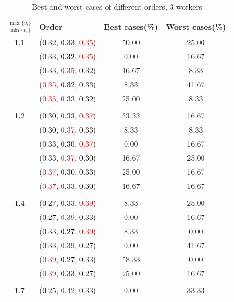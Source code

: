 \documentclass[10pt,a4paper]{report}
\begin{document}
\newpage\begin{center}
	\small
	\begin{longtable}{clcc}
		\caption{Best and worst cases of different orders, 3 workers}\\
		\toprule
		\setlength{\tabcolsep}{1mm}
		\renewcommand\baselinestretch{0.5}\selectfont
		$\frac{\max\{v_i\}}{\min\{v_i\}}$ & Order & Best cases(\%) & Worst cases(\%) \\
			\midrule		1.1			&(\textcolor{black}{0.32}, 0.33, \textcolor{red}{0.35})&50.00&25.00\\
			&(0.33, \textcolor{black}{0.32}, \textcolor{red}{0.35})&0.00&16.67\\
			&(0.33, \textcolor{red}{0.35}, \textcolor{black}{0.32})&16.67&8.33\\
			&(\textcolor{red}{0.35}, \textcolor{black}{0.32}, 0.33)&8.33&41.67\\
			&(\textcolor{red}{0.35}, 0.33, \textcolor{black}{0.32})&25.00&8.33\\
		&&&\\
		1.2			&(\textcolor{black}{0.30}, 0.33, \textcolor{red}{0.37})&33.33&16.67\\
			&(\textcolor{black}{0.30}, \textcolor{red}{0.37}, 0.33)&8.33&8.33\\
			&(0.33, \textcolor{black}{0.30}, \textcolor{red}{0.37})&0.00&16.67\\
			&(0.33, \textcolor{red}{0.37}, \textcolor{black}{0.30})&16.67&25.00\\
			&(\textcolor{red}{0.37}, \textcolor{black}{0.30}, 0.33)&25.00&16.67\\
			&(\textcolor{red}{0.37}, 0.33, \textcolor{black}{0.30})&16.67&16.67\\
		&&&\\
		1.4			&(\textcolor{black}{0.27}, 0.33, \textcolor{red}{0.39})&8.33&25.00\\
			&(\textcolor{black}{0.27}, \textcolor{red}{0.39}, 0.33)&0.00&16.67\\
			&(0.33, \textcolor{black}{0.27}, \textcolor{red}{0.39})&8.33&0.00\\
			&(0.33, \textcolor{red}{0.39}, \textcolor{black}{0.27})&0.00&41.67\\
			&(\textcolor{red}{0.39}, \textcolor{black}{0.27}, 0.33)&58.33&0.00\\
			&(\textcolor{red}{0.39}, 0.33, \textcolor{black}{0.27})&25.00&16.67\\
		&&&\\
		1.7			&(\textcolor{black}{0.25}, \textcolor{red}{0.42}, 0.33)&0.00&33.33\\

\end{longtable}
\end{center}
\end{document}
